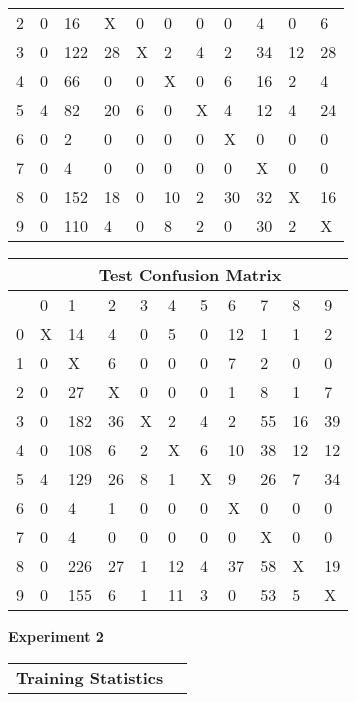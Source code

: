 \documentclass[titlepage,11pt]{article}
\begin{document}
{\begin{tabular}{|l|llllllllll|}
        2&    0&  16&   X&   0&   0&   0&   0&   4&   0&   6\\
        3&    0& 122&  28&   X&   2&   4&   2&  34&  12&  28\\
        4&    0&  66&   0&   0&   X&   0&   6&  16&   2&   4\\
        5&    4&  82&  20&   6&   0&   X&   4&  12&   4&  24\\
        6&    0&   2&   0&   0&   0&   0&   X&   0&   0&   0\\
        7&    0&   4&   0&   0&   0&   0&   0&   X&   0&   0\\
        8&    0& 152&  18&   0&  10&   2&  30&  32&   X&  16\\
        9&    0& 110&   4&   0&   8&   2&   0&  30&   2&   X\\
        \hline
        \end{tabular}
        \hspace{5pt}
        \begin{tabular}{|l|llllllllll|}
        \hline
        &\multicolumn{10}{c|}{\textbf{Test Confusion Matrix}}\\
        \hline
        &     0&   1&   2&   3&   4&   5&   6&   7&   8&   9\\
        \hline
        0&    X&  14&   4&   0&   5&   0&  12&   1&   1&   2\\
        1&    0&   X&   6&   0&   0&   0&   7&   2&   0&   0\\
        2&    0&  27&   X&   0&   0&   0&   1&   8&   1&   7\\
        3&    0& 182&  36&   X&   2&   4&   2&  55&  16&  39\\
        4&    0& 108&   6&   2&   X&   6&  10&  38&  12&  12\\
        5&    4& 129&  26&   8&   1&   X&   9&  26&   7&  34\\
        6&    0&   4&   1&   0&   0&   0&   X&   0&   0&   0\\
        7&    0&   4&   0&   0&   0&   0&   0&   X&   0&   0\\
        8&    0& 226&  27&   1&  12&   4&  37&  58&   X&  19\\
        9&    0& 155&   6&   1&  11&   3&   0&  53&   5&   X\\
        \hline
        \end{tabular}
    \textbf{Experiment 2}\\
        \begin{tabular}{l|l}
        \textbf{Training Statistics}&\\

\end{tabular}}
\end{document}

